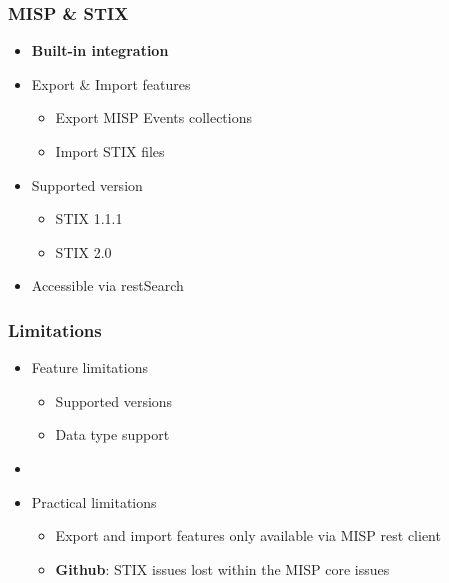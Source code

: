 
\begin{frame}[t,plain]
\titlepage
\end{frame}

\begin{frame}
    \frametitle{MISP \& STIX}
    \begin{itemize}
        \item{\bf Built-in integration}
        \item Export \& Import features
        \begin{itemize}
            \item Export MISP Events collections
            \item Import STIX files
        \end{itemize}
        \item Supported version
        \begin{itemize}
            \item STIX 1.1.1
            \item STIX 2.0
        \end{itemize}
        \item Accessible via restSearch
    \end{itemize}
\end{frame}

\begin{frame}
    \frametitle{Limitations}
    \begin{itemize}
        \item Feature limitations
        \begin{itemize}
            \item Supported versions
            \item Data type support
        \end{itemize}
        \item []
        \item Practical limitations
        \begin{itemize}
            \item Export and import features only available via MISP rest client
            \item {\bf Github}: STIX issues lost within the MISP core issues
        \end{itemize}
    \end{itemize}
\end{frame}

